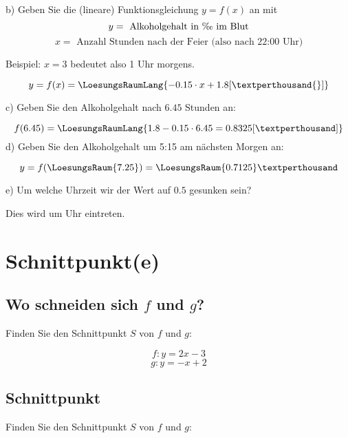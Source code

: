 b) Geben Sie die (lineare) Funktionsgleichung $y=f(x)$ an mit
$$y = \text{ Alkoholgehalt in \textperthousand{} im Blut}$$
$$x = \text{ Anzahl Stunden nach der Feier (also nach 22:00 Uhr)}$$

Beispiel: $x=3$ bedeutet also 1 Uhr morgens.

$$y = f(x) = \LoesungsRaumLang{-0.15\cdot{}x + 1.8 [\textperthousand{}]}$$

c) Geben Sie den Alkoholgehalt nach $6.45$ Stunden an:

$$f(6.45) = \LoesungsRaumLang{1.8-0.15\cdot{}6.45 = 0.8325
[\textperthousand]}$$
\TNTeop{}
d) Geben Sie den Alkoholgehalt um 5:15 am nächsten Morgen an:

$$y = f(\LoesungsRaum{7.25}) = \LoesungsRaum{0.7125}\textperthousand$$


e) Um welche Uhrzeit wir der Wert auf $0.5$\textperthousand{} gesunken
sein?

\vspace{5mm}
Dies wird um  Uhr eintreten.

\section{Schnittpunkt(e)}
\subsection{Wo schneiden sich $f$ und $g$?}
Finden Sie den Schnittpunkt $S$ von $f$ und $g$:

$$f: y= 2x-3$$
$$g: y=-x+2$$



\newpage

\subsection{Schnittpunkt}
Finden Sie den Schnittpunkt $S$ von $f$ und $g$:

